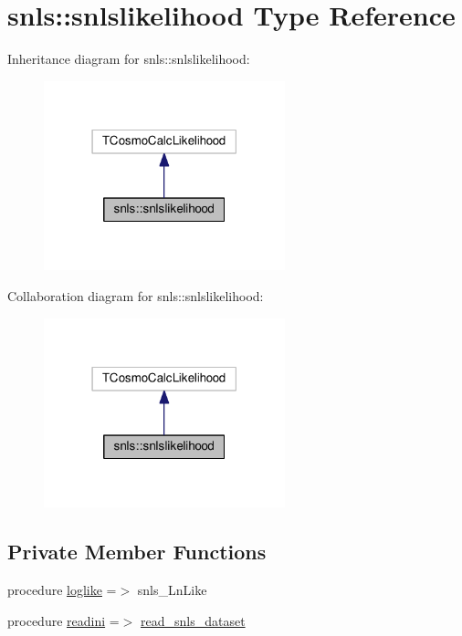 \hypertarget{structsnls_1_1snlslikelihood}{}\section{snls\+:\+:snlslikelihood Type Reference}
\label{structsnls_1_1snlslikelihood}


Inheritance diagram for snls\+:\+:snlslikelihood\+:
\nopagebreak
\begin{figure}[H]
\begin{center}
\leavevmode
\includegraphics[width=198pt]{structsnls_1_1snlslikelihood__inherit__graph}
\end{center}
\end{figure}


Collaboration diagram for snls\+:\+:snlslikelihood\+:
\nopagebreak
\begin{figure}[H]
\begin{center}
\leavevmode
\includegraphics[width=198pt]{structsnls_1_1snlslikelihood__coll__graph}
\end{center}
\end{figure}
\subsection*{Private Member Functions}
\begin{DoxyCompactItemize}
\item 
procedure \mbox{\hyperlink{structsnls_1_1snlslikelihood_a6ea370a9ca22e4440e1590f038839bb5}{loglike}} =$>$ snls\+\_\+\+Ln\+Like
\item 
procedure \mbox{\hyperlink{structsnls_1_1snlslikelihood_a80c40005273d3d4242d20a067bfd8262}{readini}} =$>$ \mbox{\hyperlink{namespacesnls_ae4b5fd7439c0c4620a5d9369c2782c9a}{read\+\_\+snls\+\_\+dataset}}
\end{DoxyCompactItemize}


